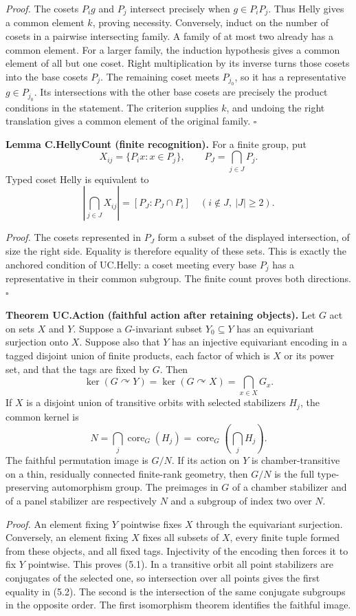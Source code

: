 \emph{Proof.} The cosets \(P_i g\) and \(P_j\) intersect precisely when
\(g\in P_iP_j\). Thus Helly gives a common element \(k\), proving
necessity. Conversely, induct on the number of cosets in a pairwise
intersecting family. A family of at most two already has a common
element. For a larger family, the induction hypothesis gives a common
element of all but one coset. Right multiplication by its inverse turns
those cosets into the base cosets \(P_j\). The remaining coset meets
\(P_{j_0}\), so it has a representative \(g\in P_{j_0}\). Its
intersections with the other base cosets are precisely the product
conditions in the statement. The criterion supplies \(k\), and undoing
the right translation gives a common element of the original family.
\(\square\)

\textbf{Lemma C.HellyCount (finite recognition).} For a finite group,
put \[
X_{ij}=\{P_i x:x\in P_j\},\qquad P_J=\bigcap_{j\in J}P_j.
\] Typed coset Helly is equivalent to \[
\left|\bigcap_{j\in J}X_{ij}\right|=[P_J:P_J\cap P_i]
\quad(i\notin J,\ |J|\ge2).
\tag{C3}
\]

\emph{Proof.} The cosets represented in \(P_J\) form a subset of the
displayed intersection, of size the right side. Equality is therefore
equality of these sets. This is exactly the anchored condition of
UC.Helly: a coset meeting every base \(P_j\) has a representative in
their common subgroup. The finite count proves both directions.
\(\square\)

\textbf{Theorem UC.Action (faithful action after retaining objects).}
Let \(G\) act on sets \(X\) and \(Y\). Suppose a \(G\)-invariant subset
\(Y_0\subseteq Y\) has an equivariant surjection onto \(X\). Suppose
also that \(Y\) has an injective equivariant encoding in a tagged
disjoint union of finite products, each factor of which is \(X\) or its
power set, and that the tags are fixed by \(G\). Then \[
\ker(G\curvearrowright Y)=\ker(G\curvearrowright X)
=\bigcap_{x\in X}G_x.
\tag{5.1}
\] If \(X\) is a disjoint union of transitive orbits with selected
stabilizers \(H_j\), the common kernel is \[
N=\bigcap_j\operatorname{core}_G(H_j)
=\operatorname{core}_G\left(\bigcap_jH_j\right).
\tag{5.2}
\] The faithful permutation image is \(G/N\). If its action on \(Y\) is
chamber-transitive on a thin, residually connected finite-rank geometry,
then \(G/N\) is the full type-preserving automorphism group. The
preimages in \(G\) of a chamber stabilizer and of a panel stabilizer are
respectively \(N\) and a subgroup of index two over \(N\).

\emph{Proof.} An element fixing \(Y\) pointwise fixes \(X\) through the
equivariant surjection. Conversely, an element fixing \(X\) fixes all
subsets of \(X\), every finite tuple formed from these objects, and all
fixed tags. Injectivity of the encoding then forces it to fix \(Y\)
pointwise. This proves (5.1). In a transitive orbit all point
stabilizers are conjugates of the selected one, so intersection over all
points gives the first equality in (5.2). The second is the intersection
of the same conjugate subgroups in the opposite order. The first
isomorphism theorem identifies the faithful image.

